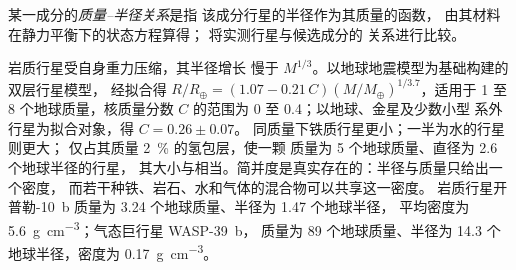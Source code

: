 \begin{definition}[质量–半径关系]\label{def:b3:exoplanets:mass-radius}
某一成分的\emph{质量–半径关系}是指
该成分行星的半径作为其质量的函数，
由其材料在静力平衡下的状态方程算得；
将实测行星与候选成分的
关系进行比较。
\end{definition}

岩质行星受自身重力压缩，其半径增长
慢于 $M^{1/3}$。以地球地震模型为基础构建的双层行星模型，
经拟合得 $R/R_\oplus = (1.07 - 0.21\,C)
(M/M_\oplus)^{1/3.7}$，适用于 1 至 8 个地球质量，核质量分数
$C$ 的范围为 0 至 0.4；以地球、金星及少数小型
系外行星为拟合对象，得 $C = 0.26 \pm 0.07$。
同质量下铁质行星更小；一半为水的行星则更大；
仅占其质量 \qty{2}{\percent} 的氢包层，使一颗
质量为 5 个地球质量、直径为 \num{2.6} 个地球半径的行星，
其大小与相当。简并度是真实存在的：半径与质量只给出一个密度，
而若干种铁、岩石、水和气体的混合物可以共享这一密度。
岩质行星开普勒-10~b 质量为 3.24 个地球质量、半径为 1.47 个地球半径，
平均密度为 \qty{5.6}{g.cm^{-3}}；气态巨行星 WASP-39~b，
质量为 89 个地球质量、半径为 14.3 个地球半径，密度为 \qty{0.17}{g.cm^{-3}}。

